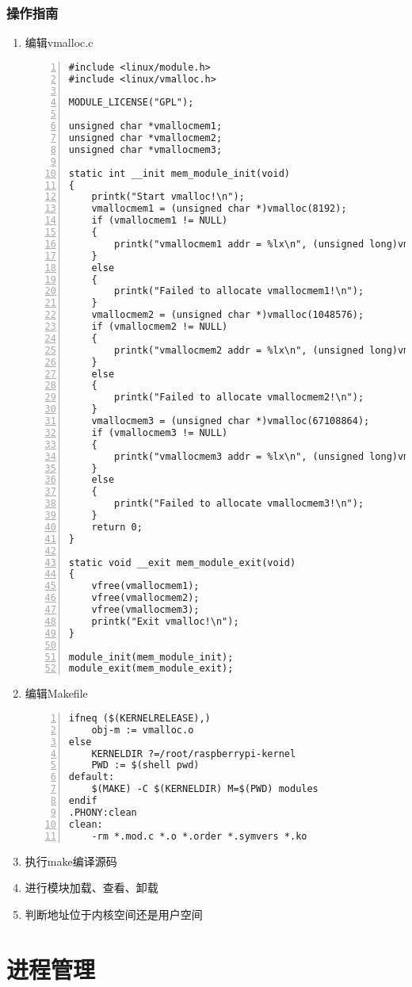 \documentclass{article}
\begin{document}
\subsubsection{操作指南}
\begin{enumerate}
	\item 编辑vmalloc.c
	      \begin{lstlisting}[numbers=left]
#include <linux/module.h>
#include <linux/vmalloc.h>

MODULE_LICENSE("GPL");

unsigned char *vmallocmem1;
unsigned char *vmallocmem2;
unsigned char *vmallocmem3;

static int __init mem_module_init(void)
{
	printk("Start vmalloc!\n");
	vmallocmem1 = (unsigned char *)vmalloc(8192);
	if (vmallocmem1 != NULL)
	{
		printk("vmallocmem1 addr = %lx\n", (unsigned long)vmallocmem1);
	}
	else
	{
		printk("Failed to allocate vmallocmem1!\n");
	}
	vmallocmem2 = (unsigned char *)vmalloc(1048576);
	if (vmallocmem2 != NULL)
	{
		printk("vmallocmem2 addr = %lx\n", (unsigned long)vmallocmem2);
	}
	else
	{
		printk("Failed to allocate vmallocmem2!\n");
	}
	vmallocmem3 = (unsigned char *)vmalloc(67108864);
	if (vmallocmem3 != NULL)
	{
		printk("vmallocmem3 addr = %lx\n", (unsigned long)vmallocmem3);
	}
	else
	{
		printk("Failed to allocate vmallocmem3!\n");
	}
	return 0;
}

static void __exit mem_module_exit(void)
{
	vfree(vmallocmem1);
	vfree(vmallocmem2);
	vfree(vmallocmem3);
	printk("Exit vmalloc!\n");
}

module_init(mem_module_init);
module_exit(mem_module_exit);

\end{lstlisting}
	\item 编辑Makefile
	      \begin{lstlisting}[numbers=left]
ifneq ($(KERNELRELEASE),)
	obj-m := vmalloc.o
else
	KERNELDIR ?=/root/raspberrypi-kernel
	PWD := $(shell pwd)
default:
	$(MAKE) -C $(KERNELDIR) M=$(PWD) modules
endif
.PHONY:clean
clean:
	-rm *.mod.c *.o *.order *.symvers *.ko
\end{lstlisting}
	\item 执行make编译源码
	\item 进行模块加载、查看、卸载
	\item 判断地址位于内核空间还是用户空间
\end{enumerate}

\newpage



\section{进程管理}
\end{document}
